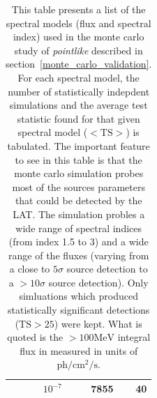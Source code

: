 \documentclass[preprint]{aastex}
\newcommand{\mev}{\text{MeV}\xspace}
\newcommand{\s}{\text{s}\xspace}
\newcommand{\ph}{\text{ph}\xspace}
\newcommand{\cm}{\text{cm}\xspace}
\newcommand{\ts}{\text{TS}\xspace}
\newcommand{\pointlike}{{\em pointlike}\xspace}
\begin{document}
\begin{table}
\begin{centering}
\begin{tabular}{ | r | r | r | r | }
      &          $10^{-7}$ &            7855 &     40 \\
\hline
\end{tabular}
\caption{
This table presents a list of the spectral models (flux and spectral index)
used in the monte carlo study of 
\pointlike described in section~\ref{monte_carlo_validation}.
For each spectral model, the number of statistically indepdent simulations
and the average test statistic found for that given spectral model
($<\ts>$) is tabulated. 
The important feature to see in this table is that the monte carlo simulation
probes most of the sources parameters that could be detected by the LAT.
The simulation probles a wide range of spectral indices (from index 1.5 to 3) and
a wide range of the fluxes (varying
from a close to $5\sigma$ source detection to a $>10\sigma$ source detection).
Only simluations which produced statistically
significant detections ($\ts>25$) were kept. 
What is quoted is the $>100\mev$ integral flux in measured in units of $\ph/\cm^2/\s$.
}
\label{ts_ext_num_sims}
  \end{centering}
\end{table}

\clearpage
\end{document}
